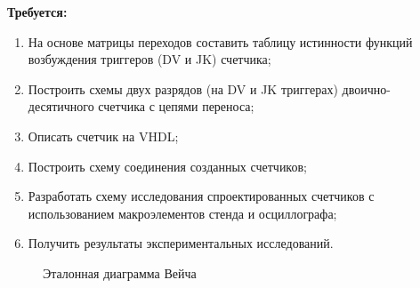 \documentclass[a4paper,12pt]{article}
\begin{document}
\textbf{Требуется:}
\begin{enumerate}
\item{На основе матрицы переходов составить таблицу истинности функций возбуждения триггеров (DV и JK) счетчика;}
\item{Построить схемы двух разрядов (на DV и JK триггерах) двоично-десятичного счетчика с цепями переноса;}
\item{Описать счетчик на VHDL;}
\item{Построить схему соединения созданных счетчиков;}
\item{Разработать схему исследования спроектированных счетчиков с использованием макроэлементов стенда и осциллографа;}
\item{Получить результаты экспериментальных исследований.}
\end{enumerate}

\begin{figure}[!htb]\centering
\caption{Эталонная диаграмма Вейча}
\end{figure}
\end{document}
